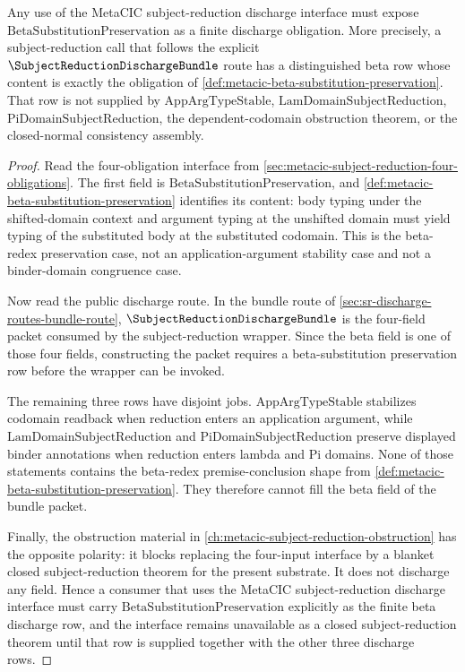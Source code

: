 \begin{proposition}
\label{prop:metacic-beta-substitution-preservation-mandatory-discharge-row}
Any use of the MetaCIC subject-reduction discharge interface must expose $\mathrm{BetaSubstitutionPreservation}$ as a finite discharge obligation. More precisely, a subject-reduction call that follows the explicit $\SubjectReductionDischargeBundle$ route has a distinguished beta row whose content is exactly the obligation of \autoref{def:metacic-beta-substitution-preservation}. That row is not supplied by $\mathrm{AppArgTypeStable}$, $\mathrm{LamDomainSubjectReduction}$, $\mathrm{PiDomainSubjectReduction}$, the dependent-codomain obstruction theorem, or the closed-normal consistency assembly.
\end{proposition}
\begin{proof}
Read the four-obligation interface from \autoref{sec:metacic-subject-reduction-four-obligations}. The first field is $\mathrm{BetaSubstitutionPreservation}$, and \autoref{def:metacic-beta-substitution-preservation} identifies its content: body typing under the shifted-domain context and argument typing at the unshifted domain must yield typing of the substituted body at the substituted codomain. This is the beta-redex preservation case, not an application-argument stability case and not a binder-domain congruence case.

Now read the public discharge route. In the bundle route of \autoref{sec:sr-discharge-routes-bundle-route}, $\SubjectReductionDischargeBundle$ is the four-field packet consumed by the subject-reduction wrapper. Since the beta field is one of those four fields, constructing the packet requires a beta-substitution preservation row before the wrapper can be invoked.

The remaining three rows have disjoint jobs. $\mathrm{AppArgTypeStable}$ stabilizes codomain readback when reduction enters an application argument, while $\mathrm{LamDomainSubjectReduction}$ and $\mathrm{PiDomainSubjectReduction}$ preserve displayed binder annotations when reduction enters lambda and Pi domains. None of those statements contains the beta-redex premise-conclusion shape from \autoref{def:metacic-beta-substitution-preservation}. They therefore cannot fill the beta field of the bundle packet.

Finally, the obstruction material in \autoref{ch:metacic-subject-reduction-obstruction} has the opposite polarity: it blocks replacing the four-input interface by a blanket closed subject-reduction theorem for the present substrate. It does not discharge any field. Hence a consumer that uses the MetaCIC subject-reduction discharge interface must carry $\mathrm{BetaSubstitutionPreservation}$ explicitly as the finite beta discharge row, and the interface remains unavailable as a closed subject-reduction theorem until that row is supplied together with the other three discharge rows.
\end{proof}

